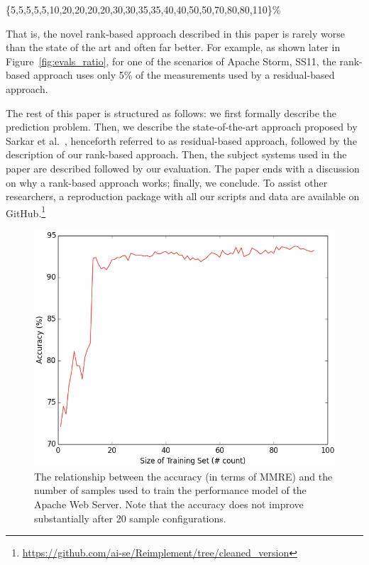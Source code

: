 \documentclass[sigconf]{acmart}
\begin{document}
\begin{center}
\{5,5,5,5,5,10,20,20,20,20,30,30,35,35,40,40,50,50,70,80,80,110\}\%
\end{center}

\noindent
That is, the novel rank-based approach described in this paper is rarely worse than the  state of the art and often far better. For example, as shown later in Figure~\ref{fig:evals_ratio}, for one of the scenarios of Apache Storm, SS11, the rank-based approach uses only 5\% of the measurements used by a residual-based approach.

The rest of this paper is structured as follows: we first formally describe the prediction problem. Then, we describe the state-of-the-art approach proposed by Sarkar et al.~\cite{sarkar2015cost}, henceforth referred to as residual-based approach, followed by the description of our rank-based approach. Then, the subject systems used in the paper are described followed by our evaluation. The paper ends with a discussion on why a rank-based approach works; finally, we conclude.
To assist other researchers, a reproduction package with all our scripts and data are available
on GitHub.\footnote{
\url{https://github.com/ai-se/Reimplement/tree/cleaned_version}
}


\begin{figure}[t]
\centering
\includegraphics[scale=0.23]{Figures/figure3}
\caption{{\small The relationship between the accuracy (in terms of MMRE) and the number of samples used to train the performance model of the Apache Web Server. Note that the accuracy does not improve substantially after 20 sample configurations.}
}
\label{fig:learning_curve}
\end{figure}
\end{document}
